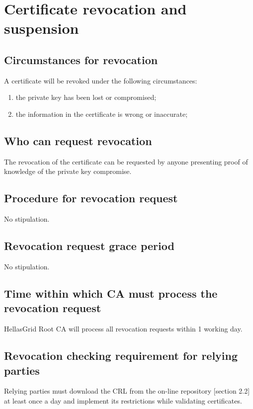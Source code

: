 \documentclass[11pt,a4paper,titlepage]{book}
\begin{document}
\section{Certificate revocation and suspension}
\subsection{Circumstances for revocation}

A certificate will be revoked under the following circumstances:

\begin{enumerate}
\item{the private key has been lost or compromised;}
\item{the information in the certificate is wrong or inaccurate;}
\end{enumerate}

\subsection{Who can request revocation}

The revocation of the certificate can be requested by anyone presenting proof of knowledge of the private key compromise.


\subsection{Procedure for revocation request}

No stipulation.


\subsection{Revocation request grace period}

No stipulation.

\subsection{Time within which CA must process the revocation request}

HellasGrid Root CA will process all revocation requests within 1 working day.

\subsection{Revocation checking requirement for relying parties}

Relying parties must download the CRL from the on-line repository [section 2.2] at least once a day and implement its restrictions while validating certificates.
\end{document}
